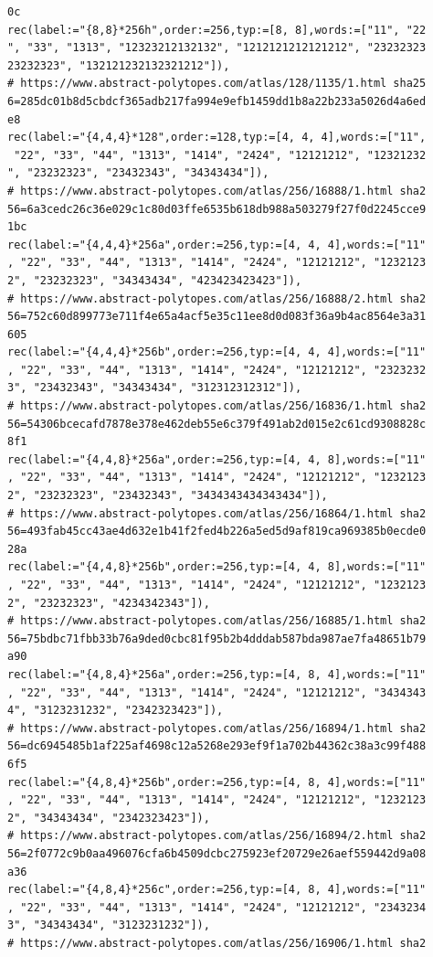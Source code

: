 \documentclass[
  11pt,
  a4paper,
]{article}
\begin{document}
\begin{verbatim}
0c
rec(label:="{8,8}*256h",order:=256,typ:=[8, 8],words:=["11", "22
", "33", "1313", "12323212132132", "1212121212121212", "23232323
23232323", "132121232132321212"]),
# https://www.abstract-polytopes.com/atlas/128/1135/1.html sha25
6=285dc01b8d5cbdcf365adb217fa994e9efb1459dd1b8a22b233a5026d4a6ed
e8
rec(label:="{4,4,4}*128",order:=128,typ:=[4, 4, 4],words:=["11",
 "22", "33", "44", "1313", "1414", "2424", "12121212", "12321232
", "23232323", "23432343", "34343434"]),
# https://www.abstract-polytopes.com/atlas/256/16888/1.html sha2
56=6a3cedc26c36e029c1c80d03ffe6535b618db988a503279f27f0d2245cce9
1bc
rec(label:="{4,4,4}*256a",order:=256,typ:=[4, 4, 4],words:=["11"
, "22", "33", "44", "1313", "1414", "2424", "12121212", "1232123
2", "23232323", "34343434", "423423423423"]),
# https://www.abstract-polytopes.com/atlas/256/16888/2.html sha2
56=752c60d899773e711f4e65a4acf5e35c11ee8d0d083f36a9b4ac8564e3a31
605
rec(label:="{4,4,4}*256b",order:=256,typ:=[4, 4, 4],words:=["11"
, "22", "33", "44", "1313", "1414", "2424", "12121212", "2323232
3", "23432343", "34343434", "312312312312"]),
# https://www.abstract-polytopes.com/atlas/256/16836/1.html sha2
56=54306bcecafd7878e378e462deb55e6c379f491ab2d015e2c61cd9308828c
8f1
rec(label:="{4,4,8}*256a",order:=256,typ:=[4, 4, 8],words:=["11"
, "22", "33", "44", "1313", "1414", "2424", "12121212", "1232123
2", "23232323", "23432343", "3434343434343434"]),
# https://www.abstract-polytopes.com/atlas/256/16864/1.html sha2
56=493fab45cc43ae4d632e1b41f2fed4b226a5ed5d9af819ca969385b0ecde0
28a
rec(label:="{4,4,8}*256b",order:=256,typ:=[4, 4, 8],words:=["11"
, "22", "33", "44", "1313", "1414", "2424", "12121212", "1232123
2", "23232323", "4234342343"]),
# https://www.abstract-polytopes.com/atlas/256/16885/1.html sha2
56=75bdbc71fbb33b76a9ded0cbc81f95b2b4dddab587bda987ae7fa48651b79
a90
rec(label:="{4,8,4}*256a",order:=256,typ:=[4, 8, 4],words:=["11"
, "22", "33", "44", "1313", "1414", "2424", "12121212", "3434343
4", "3123231232", "2342323423"]),
# https://www.abstract-polytopes.com/atlas/256/16894/1.html sha2
56=dc6945485b1af225af4698c12a5268e293ef9f1a702b44362c38a3c99f488
6f5
rec(label:="{4,8,4}*256b",order:=256,typ:=[4, 8, 4],words:=["11"
, "22", "33", "44", "1313", "1414", "2424", "12121212", "1232123
2", "34343434", "2342323423"]),
# https://www.abstract-polytopes.com/atlas/256/16894/2.html sha2
56=2f0772c9b0aa496076cfa6b4509dcbc275923ef20729e26aef559442d9a08
a36
rec(label:="{4,8,4}*256c",order:=256,typ:=[4, 8, 4],words:=["11"
, "22", "33", "44", "1313", "1414", "2424", "12121212", "2343234
3", "34343434", "3123231232"]),
# https://www.abstract-polytopes.com/atlas/256/16906/1.html sha2

\end{verbatim}
\end{document}

